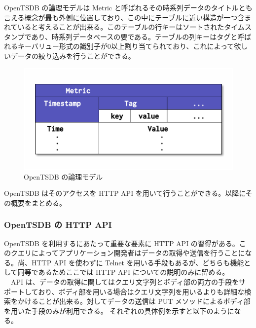 \documentclass{scrartcl}
\begin{document}
\newpage

OpenTSDB の論理モデルは Metric と呼ばれるその時系列データのタイトルとも言える概念が最も外側に位置しており、この中にテーブルに近い構造が一つ含まれていると考えることが出来る。このテーブルの行キーはソートされたタイムスタンプであり、時系列データベースの要である。テーブルの列キーはタグと呼ばれるキーバリュー形式の識別子が0以上割り当てられており、これによって欲しいデータの絞り込みを行うことができる。\\

\begin{figure}[htbp]
\centering
\includegraphics[width=12cm]{hoge4.png}
\caption{OpenTSDB の論理モデル}
\end{figure}

OpenTSDB はそのアクセスを HTTP API を用いて行うことができる。以降にその概要をまとめる。\\

\subsubsection{OpenTSDB の HTTP API}
\label{sec:orgf330a65}
OpenTSDB を利用するにあたって重要な要素に HTTP API の習得がある。このクエリによってアプリケーション開発者はデータの取得や送信を行うことになる。尚、HTTP API を使わずに Telnet を用いる手段もあるが、どちらも機能として同等であるためここでは HTTP API についての説明のみに留める。\\
　API は、データの取得に関してはクエリ文字列とボディ部の両方の手段をサポートしており、ボディ部を用いる場合はクエリ文字列を用いるよりも詳細な検索をかけることが出来る。対してデータの送信は PUT メソッドによるボディ部を用いた手段のみが利用できる。 それぞれの具体例を示すと以下のようになる。\\
\end{document}
